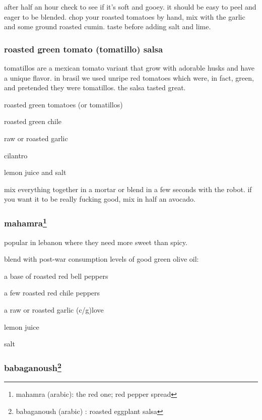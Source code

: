 after half an hour check to see if it's soft and gooey. it should be easy to 
peel and eager to be blended. chop your roasted tomatoes by hand, mix with the 
garlic and some ground roasted cumin. taste before adding salt and lime.

\subsubsection{roasted green tomato (tomatillo) salsa}

tomatillos are a mexican tomato variant that grow with adorable husks and have 
a unique flavor. in brasil we used unripe red tomatoes which were, in fact, 
green, and pretended they were tomatillos. the salsa tasted great.

\begin{ingredients}
  \item roasted green tomatoes (or tomatillos)
  \item roasted green chile
  \item raw or roasted garlic
  \item cilantro
  \item lemon juice and salt
\end{ingredients}

mix everything together in a mortar or blend in a few seconds with the robot. 
if you want it to be really fucking good, mix in half an avocado.

\subsubsection{mahamra\footnote{mahamra (arabic): the red one; red pepper 
spread}}

popular in lebanon where they need more sweet than spicy.

blend with post-war consumption levels of good green olive oil:

\begin{ingredients}
  \item a base of roasted red bell peppers
  \item a few roasted red chile peppers
  \item a raw or roasted garlic (c/g)love
  \item lemon juice
  \item salt
\end{ingredients}

\subsubsection{babaganoush\footnote{babaganoush (arabic) : roasted eggplant 
salsa}}

